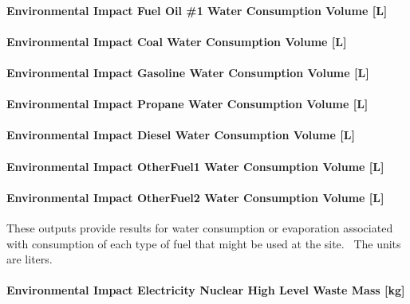 \paragraph{Environmental Impact Fuel Oil \#1 Water Consumption Volume {[}L{]}}\label{environmental-impact-fuel-oil-1-water-consumption-volume-l}

\paragraph{Environmental Impact Coal Water Consumption Volume {[}L{]}}\label{environmental-impact-coal-water-consumption-volume-l}

\paragraph{Environmental Impact Gasoline Water Consumption Volume {[}L{]}}\label{environmental-impact-gasoline-water-consumption-volume-l}

\paragraph{Environmental Impact Propane Water Consumption Volume {[}L{]}}\label{environmental-impact-propane-water-consumption-volume-l}

\paragraph{Environmental Impact Diesel Water Consumption Volume {[}L{]}}\label{environmental-impact-diesel-water-consumption-volume-l}

\paragraph{Environmental Impact OtherFuel1 Water Consumption Volume {[}L{]}}\label{environmental-impact-otherfuel1-water-consumption-volume-l}

\paragraph{Environmental Impact OtherFuel2 Water Consumption Volume {[}L{]}}\label{environmental-impact-otherfuel2-water-consumption-volume-l}

These outputs provide results for water consumption or evaporation associated with consumption of each type of fuel that might be used at the site.~ The units are liters.

\paragraph{Environmental Impact Electricity Nuclear High Level Waste Mass {[}kg{]}}\label{environmental-impact-electricity-nuclear-high-level-waste-mass-kg}

